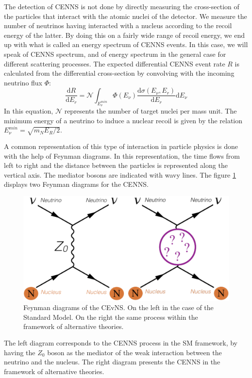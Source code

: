 The detection of CENNS is not done by directly measuring the cross-section of the particles that interact with the atomic nuclei of the detector. We measure the number of neutrinos having interacted with a nucleus according to the recoil energy of the latter. By doing this on a fairly wide range of recoil energy, we end up with what is called an energy spectrum of CENNS events. In this case, we will speak of CENNS spectrum, and of energy spectrum in the general case for different scattering processes. The expected differential CENNS event rate $R$ is calculated from the differential cross-section by convolving with the incoming neutrino flux $\Phi$:
\begin{equation}
\frac{\mathrm{d} R}{\mathrm{d} E_r}
=
\mathcal{N}
\int_{E_{\nu}^{min}}
\Phi(E_{\nu})
\frac{\mathrm{d} \sigma (E_{\nu}, E_r) }{\mathrm{d} E_r} \mathrm{d} E_{\nu}
\end{equation}
In this equation, $\mathcal{N}$ represents the number of target nuclei per mass unit. The minimum energy of a neutrino to induce a nuclear recoil is given by the relation $E_{\nu}^{min}= \sqrt{m_N E_R /2}$.

A common representation of this type of interaction in particle physics is done with the help of Feynman diagrams. In this representation, the time flows from left to right and the distance between the particles is represented along the vertical axis. The mediator bosons are indicated with wavy lines. The figure \ref{fig:cenns-feynman} displays two Feynman diagrams for the CENNS.
\begin{figure}
\centering
\includegraphics [scale=1]{Figures/Introduction/cenns_feynman.png}
\caption{Feynman diagrams of the CEvNS. On the left in the case of the Standard Model. On the right the same process within the framework of alternative theories.}
\label{fig:cenns-feynman}
\end{figure}
The left diagram corresponds to the CENNS process in the SM framework, by having the $Z_0$ boson as the mediator of the weak interaction between the neutrino and the nucleus. The right diagram presents the CENNS in the framework of alternative theories.


